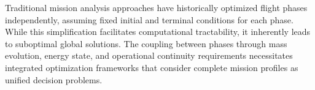 Traditional mission analysis approaches have historically optimized flight phases independently, assuming fixed initial and terminal conditions for each phase. While this simplification facilitates computational tractability, it inherently leads to suboptimal global solutions. The coupling between phases through mass evolution, energy state, and operational continuity requirements necessitates integrated optimization frameworks that consider complete mission profiles as unified decision problems.


